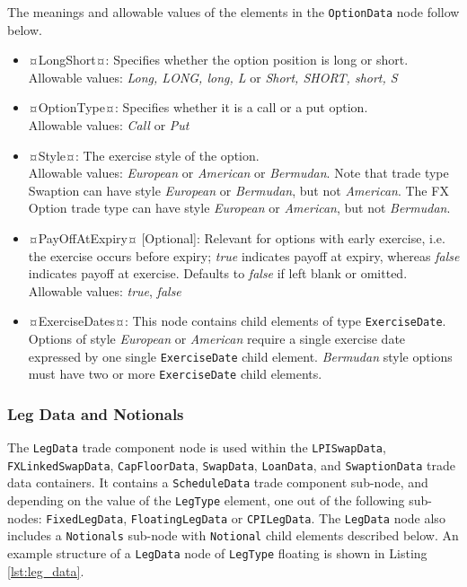 The meanings and allowable values of the elements in the \lstinline!OptionData! node follow below.

\begin{itemize}
\item ¤LongShort¤: Specifies whether the option position is long  or short.  \\Allowable values: \emph{Long, LONG, long, L} or \emph{Short, SHORT, short, S}
\item ¤OptionType¤: Specifies whether it is a call or a put option. \\Allowable values: \emph{Call} or \emph{Put} 
\item ¤Style¤: The exercise style of the option. \\Allowable values: \emph{European} or \emph{American} or \emph{Bermudan}. Note that trade type Swaption can have style  \emph{European} or  \emph{Bermudan}, but not \emph{American}. The FX Option trade type can have style \emph{European} or \emph{American}, but not \emph{Bermudan}.
\item ¤PayOffAtExpiry¤ [Optional]: Relevant for options with early exercise, i.e. the exercise occurs before expiry; \emph{true}  indicates payoff at expiry, whereas \emph{false}  indicates payoff at exercise. Defaults to \emph{false}  if left blank or omitted. \\Allowable values: \emph{true}, \emph{false}
\item ¤ExerciseDates¤: This node contains child elements of type \lstinline!ExerciseDate!.  Options of style \emph{European} or \emph{American} require a single exercise date expressed by one single \lstinline!ExerciseDate! child element.  \emph{Bermudan} style options must have two or more \lstinline!ExerciseDate! child elements.


\end{itemize}



\subsubsection{Leg Data and Notionals}
\label{ss:leg_data}

The \lstinline!LegData! trade component node is used within the \lstinline!LPISwapData!, \lstinline!FXLinkedSwapData!, \lstinline!CapFloorData!,  \lstinline!SwapData!, \lstinline!LoanData!, and \lstinline!SwaptionData! trade data containers. It contains a \lstinline!ScheduleData! trade component sub-node, and depending on the value of the \lstinline!LegType! element, one out of the following sub-nodes:  \lstinline!FixedLegData!, \lstinline!FloatingLegData! or \lstinline!CPILegData!. The \lstinline!LegData! node also includes a \lstinline!Notionals! sub-node  with \lstinline!Notional! child elements described below. An example structure of a \lstinline!LegData! node of \lstinline!LegType! floating is shown in Listing \ref{lst:leg_data}.


